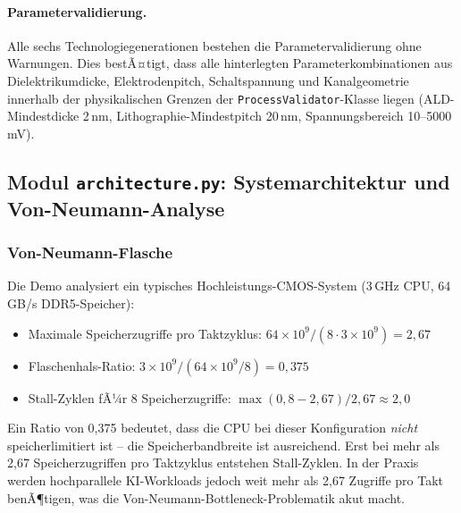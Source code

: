 ﻿\documentclass[a4paper,12pt]{scrreprt}
\theoremstyle{definition}
\begin{document}
\paragraph{Parametervalidierung.}
Alle sechs Technologiegenerationen bestehen die Parametervalidierung ohne Warnungen.
Dies bestÃ¤tigt, dass alle hinterlegten Parameterkombinationen aus
Dielektrikumdicke, Elektrodenpitch, Schaltspannung und Kanalgeometrie
innerhalb der physikalischen Grenzen der \texttt{ProcessValidator}-Klasse liegen
(ALD-Mindest\-dicke 2\,nm, Lithographie-Mindestpitch 20\,nm, Spannungsbereich 10--5000\,mV).

\subsection{Modul \texttt{architecture.py}: Systemarchitektur und Von-Neumann-Analyse}
\label{subsec:demo_architecture}

\subsubsection{Von-Neumann-Flasche}

Die Demo analysiert ein typisches Hochleistungs-CMOS-System (3\,GHz CPU,
64\,GB/s DDR5-Speicher):

\begin{itemize}
	\item Maximale Speicherzugriffe pro Taktzyklus: $64 \times 10^9 / (8 \cdot 3 \times 10^9) = 2{,}67$
	\item Flaschenhals-Ratio: $3 \times 10^9 / (64 \times 10^9 / 8) = 0{,}375$
	\item Stall-Zyklen fÃ¼r 8 Speicherzugriffe: $\max(0, 8 - 2{,}67) / 2{,}67 \approx 2{,}0$
\end{itemize}

Ein Ratio von 0,375 bedeutet, dass die CPU bei dieser Konfiguration
\emph{nicht} speicherlimitiert ist -- die Speicherbandbreite ist ausreichend.
Erst bei mehr als 2,67 Speicherzugriffen pro Taktzyklus entstehen Stall-Zyklen.
In der Praxis werden hochparallele KI-Workloads jedoch weit mehr als 2,67
Zugriffe pro Takt benÃ¶tigen, was die Von-Neumann-Bottleneck-Problematik
akut macht.
\end{document}
